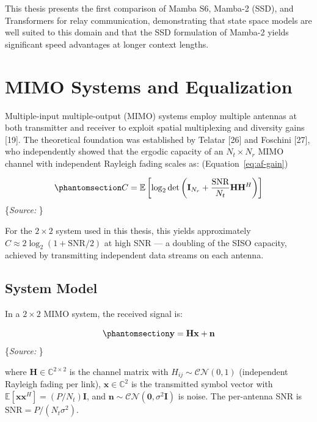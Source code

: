 \documentclass[
  english,
  12pt,
  12pt,
  a4paper,
  oneside]{report}
\begin{document}
This thesis presents the first comparison of Mamba S6, Mamba-2 (SSD), and Transformers for relay communication, demonstrating that state space models are well suited to this domain and that the SSD formulation of Mamba-2 yields significant speed advantages at longer context lengths.

\section{MIMO Systems and Equalization}\label{sec:mimo-systems-and-equalization}

Multiple-input multiple-output (MIMO) systems employ multiple antennas at both transmitter and receiver to exploit spatial multiplexing and diversity gains {[}19{]}. The theoretical foundation was established by Telatar {[}26{]} and Foschini {[}27{]}, who independently showed that the ergodic capacity of an \(N_t \times N_r\) MIMO channel with independent Rayleigh fading scales as: (Equation~\ref{eq:af-gain})

\begin{equation}\protect\phantomsection\label{eq:mimo-capacity}{C = \mathbb{E}\left[\log_2 \det\left(\mathbf{I}_{N_r} + \frac{\text{SNR}}{N_t}\mathbf{H}\mathbf{H}^H\right)\right]
}\end{equation} \footnotesize\{\textit{Source: \1}\}\normalsize

For the \(2 \times 2\) system used in this thesis, this yields approximately \(C \approx 2\log_2(1 + \text{SNR}/2)\) at high SNR --- a doubling of the SISO capacity, achieved by transmitting independent data streams on each antenna.

\subsection{System Model}\label{sec:system-model}

In a \(2 \times 2\) MIMO system, the received signal is:

\begin{equation}\protect\phantomsection\label{eq:mimo-received}{\mathbf{y} = \mathbf{H}\mathbf{x} + \mathbf{n}
}\end{equation} \footnotesize\{\textit{Source: \1}\}\normalsize

where \(\mathbf{H} \in \mathbb{C}^{2 \times 2}\) is the channel matrix with \(H_{ij} \sim \mathcal{CN}(0, 1)\) (independent Rayleigh fading per link), \(\mathbf{x} \in \mathbb{C}^{2}\) is the transmitted symbol vector with \(\mathbb{E}[\mathbf{x}\mathbf{x}^H] = (P/N_t)\mathbf{I}\), and \(\mathbf{n} \sim \mathcal{CN}(\mathbf{0}, \sigma^2\mathbf{I})\) is noise. The per-antenna SNR is \(\text{SNR} = P/(N_t \sigma^2)\).
\end{document}

